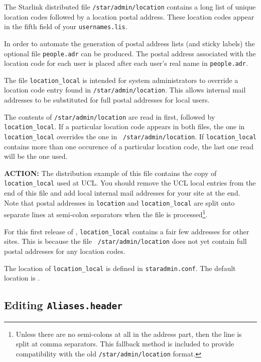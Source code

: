 The Starlink distributed file {\tt /star/admin/location} contains a long
list of unique location codes followed by a location postal address. These
location codes appear in the fifth field of your {\tt usernames.lis}.

In order to automate the generation of postal address lists (and sticky
labels) the optional file {\tt people.adr} can be produced. The postal
address associated with the location code for each user is placed after
each user's real name in {\tt people.adr}.

The file {\tt location\_local} is intended for system administrators to
override a location code entry found in {\tt /star/admin/location}. This
allows internal mail addresses to be substituted for full postal addresses
for local users.

The contents of {\tt /star/admin/location} are read in first, followed by
{\tt location\_local}. If a particular location code appears in both
files, the one in {\tt location\_local} overrides the one in {\tt
/star/admin/location}. If {\tt location\_local} contains more than one
occurence of a particular location code, the last one read will be the one
used.

{\large\bf ACTION:} The distribution example of this file contains the
copy of {\tt location\_local} used at UCL. You should remove the UCL local
entries from the end of this file and add local internal mail addresses
for your site at the end. Note that postal addresses in {\tt location} and
{\tt location\_local} are split onto separate lines at semi-colon
separators when the file is processed\footnote{Unless there are no
semi-colons at all in the address part, then the line is split at comma
separators. This fallback method is included to provide compatibility with
the old {\tt /star/admin/location} format.}.

For this first release of \staradmin, {\tt location\_local} contains a
fair few addresses for other sites. This is because the file {\tt
/star/admin/location} does not yet contain full postal addresses for any
location codes.

The location of {\tt location\_local} is defined in {\tt staradmin.conf}.
The default location is .

\subsection{Editing {\tt Aliases.header}}

